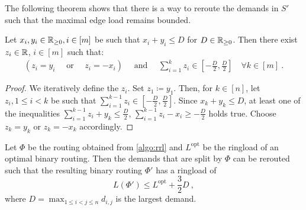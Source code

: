 The following theorem shows that there is a way to reroute the demands in $S'$ such that the maximal edge load remains bounded.
\begin{lemma}
	\label{lemma:reroute-demands}
	Let $x_i, y_i \in \mathbb{R}_{\geq 0}, i \in [m]$ be such that $x_i + y_i \leq D$ for $D \in \mathbb{R}_{\geq 0}$.
	Then there exist $z_i \in \mathbb{R}$, $i \in [m]$ such that:
	\begin{align}
		(z_i = y_i \quad \text{ or } \quad z_i = -x_i) 
		\quad \text{ and } \quad \sum_{i=1}^k z_i \in \left[-\frac{D}{2}, \frac{D}{2}\right] \quad \forall k \in [m] \ .
	\end{align}
\end{lemma}
\begin{proof}
	We iteratively define the $z_i$.
	Set $z_1 \coloneqq y_1$.
	Then, for $k \in [n]$, let $z_i, 1 \leq i < k$ be such that $\sum_{i=1}^{k-1} z_i \in \left[-\frac{D}{2}, \frac{D}{2}\right]$.
	Since $x_k + y_k \leq D$, at least one of the inequalities $\sum_{i=1}^{k-1} z_i + y_k \leq \frac{D}{2}$, $\sum_{i=1}^{k-1} z_i - x_i \geq -\frac{D}{2}$ holds true.
	Choose $z_k = y_k$ or $z_k = -x_k$ accordingly.	
\end{proof}
\begin{theorem}
	\label{theo:ring-loading-algorithm}
	Let $\Phi$ be the routing obtained from \cref{algo:rrl} and $L^\mathrm{opt}$ be the ringload of an optimal binary routing.
	Then the demands that are split by $\Phi$ can be rerouted such that the resulting binary routing $\Phi'$ has a ringload of
	\begin{equation}
		L(\Phi') \leq L^\mathrm{opt} + \frac{3}{2}D \ ,
	\end{equation}
	where $D = \max_{1 \leq i < j \leq n} d_{i, j}$ is the largest demand.
\end{theorem}
